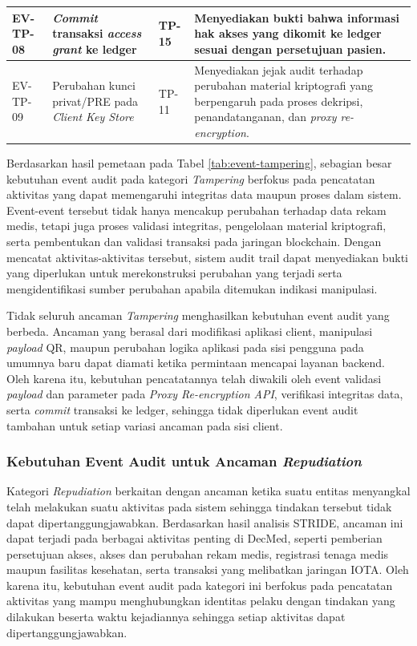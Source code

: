 \begin{xltabular}{\textwidth}{|>{\centering\arraybackslash}p{1.4cm}|X|>{\centering\arraybackslash}p{1.9cm}|X|}
EV-TP-08 &
\textit{Commit} transaksi \textit{access grant} ke ledger &
TP-15 &
Menyediakan bukti bahwa informasi hak akses yang dikomit ke ledger sesuai dengan persetujuan pasien.\\
\hline

EV-TP-09 &
Perubahan kunci privat/PRE pada \textit{Client Key Store} &
TP-11 &
Menyediakan jejak audit terhadap perubahan material kriptografi yang berpengaruh pada proses dekripsi, penandatanganan, dan \textit{proxy re-encryption}.\\
\hline

\end{xltabular}

Berdasarkan hasil pemetaan pada Tabel \ref{tab:event-tampering}, sebagian besar kebutuhan event audit pada kategori \textit{Tampering} berfokus pada pencatatan aktivitas yang dapat memengaruhi integritas data maupun proses dalam sistem. Event-event tersebut tidak hanya mencakup perubahan terhadap data rekam medis, tetapi juga proses validasi integritas, pengelolaan material kriptografi, serta pembentukan dan validasi transaksi pada jaringan blockchain. Dengan mencatat aktivitas-aktivitas tersebut, sistem audit trail dapat menyediakan bukti yang diperlukan untuk merekonstruksi perubahan yang terjadi serta mengidentifikasi sumber perubahan apabila ditemukan indikasi manipulasi.

Tidak seluruh ancaman \textit{Tampering} menghasilkan kebutuhan event audit yang berbeda. Ancaman yang berasal dari modifikasi aplikasi client, manipulasi \textit{payload} QR, maupun perubahan logika aplikasi pada sisi pengguna pada umumnya baru dapat diamati ketika permintaan mencapai layanan backend. Oleh karena itu, kebutuhan pencatatannya telah diwakili oleh event validasi \textit{payload} dan parameter pada \textit{Proxy Re-encryption API}, verifikasi integritas data, serta \textit{commit} transaksi ke ledger, sehingga tidak diperlukan event audit tambahan untuk setiap variasi ancaman pada sisi client.

\subsubsection{Kebutuhan Event Audit untuk Ancaman \textit{Repudiation}}

Kategori \textit{Repudiation} berkaitan dengan ancaman ketika suatu entitas menyangkal telah melakukan suatu aktivitas pada sistem sehingga tindakan tersebut tidak dapat dipertanggungjawabkan. Berdasarkan hasil analisis STRIDE, ancaman ini dapat terjadi pada berbagai aktivitas penting di DecMed, seperti pemberian persetujuan akses, akses dan perubahan rekam medis, registrasi tenaga medis maupun fasilitas kesehatan, serta transaksi yang melibatkan jaringan IOTA. Oleh karena itu, kebutuhan event audit pada kategori ini berfokus pada pencatatan aktivitas yang mampu menghubungkan identitas pelaku dengan tindakan yang dilakukan beserta waktu kejadiannya sehingga setiap aktivitas dapat dipertanggungjawabkan.

